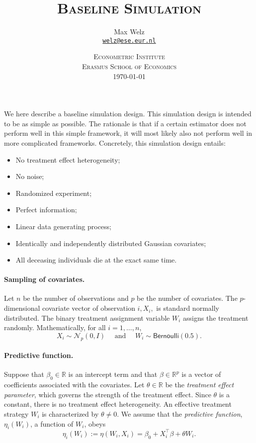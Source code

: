 \documentclass[11pt]{article}
\title{\textsc{Baseline Simulation}}
\author{Max Welz \\
  \href{mailto:welz@ese.eur.nl}{\texttt{welz@ese.eur.nl}}}
\date{%
    \textsc{Econometric Institute\\ Erasmus School of Economics}\\[2ex]%
    \today}
\newcommand{\R}{\mathbb{R}}
\begin{document}
\maketitle
We here describe a baseline simulation design. This simulation design is intended to be as simple as possible. The rationale is that if a certain estimator does not perform well in this simple framework, it will most likely also not perform well in more complicated frameworks. Concretely, this simulation design entails:
\begin{itemize}
    \item No treatment effect heterogeneity;
    \item No noise;
    \item Randomized experiment;
    \item Perfect information;
    \item Linear data generating process;
    \item Identically and independently distributed Gaussian covariates;
    \item All deceasing individuals die at the exact same time.
\end{itemize}

\paragraph{Sampling of covariates.} Let $n$ be the number of observations and $p$ be the number of covariates. The $p$-dimensional covariate vector of observation $i, X_i,$ is standard normally distributed. The binary treatment assignment variable $W_i$ assigns the treatment randomly. Mathematically, for all $i = 1,\dots,n$,
\[
    X_i \sim \mathcal{N}_p(0, I)
    \quad  \text{ and }\quad 
    W_i \sim \textsf{Bernoulli}(0.5).
\]

\paragraph{Predictive function.}
Suppose that $\beta_0\in\R$ is an intercept term and that $\beta\in\R^p$ is a vector of coefficients associated with the covariates. Let $\theta\in\R$ be the \textit{treatment effect parameter}, which governs the strength of the treatment effect. Since $\theta$ is a constant, there is no treatment effect heterogeneity. An effective treatment strategy $W_i$ is characterized by $\theta \neq 0$. We assume that the \textit{predictive function}, $\eta_i(W_i)$, a function of $W_i$, obeys
\[
    \eta_i(W_i) := \eta(W_i, X_i)
    =
    \beta_0 + X_i^\top \beta + \theta W_i.
\]
\end{document}
